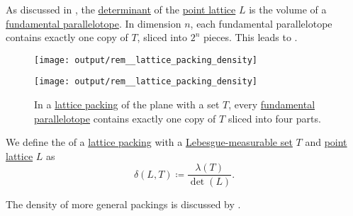 \begin{remark}\label{rem:lattice_packing_density}
  As discussed in , the \hyperref[def:point_lattice_determinant]{determinant} of the \hyperref[def:point_lattice]{point lattice} \( L \) is the volume of a \hyperref[def:fundamental_paralellotope]{fundamental parallelotope}. In dimension \( n \), each fundamental parallelotope contains exactly one copy of \( T \), sliced into \( 2^n \) pieces. This leads to .

  \begin{figure}[!ht]
    \begin{subcaptionblock}{0.45\linewidth}
      \centering
      \texttt{[image: output/rem\_\_lattice\_packing\_density]}
    \end{subcaptionblock}
    \hfill
    \begin{subcaptionblock}{0.45\linewidth}
      \centering
      \texttt{[image: output/rem\_\_lattice\_packing\_density]}
    \end{subcaptionblock}
    \caption{In a \hyperref[def:lattice_packing]{lattice packing} of the plane with a set \( T \), every \hyperref[def:fundamental_paralellotope]{fundamental parallelotope} contains exactly one copy of \( T \) sliced into four parts.}\label{fig:rem:lattice_packing_density}
  \end{figure}
\end{remark}

\begin{definition}\label{def:lattice_packing_density}
  We define the  of a \hyperref[def:lattice_packing]{lattice packing} with a \hyperref[def:lebesgue_measure]{Lebesgue-measurable set} \( T \) and \hyperref[def:point_lattice]{point lattice} \( L \) as
  \begin{equation}\label{eq:def:lattice_packing_density}
    \delta(L, T) \coloneqq \frac {\lambda(T)} {\det(L)}.
  \end{equation}
\end{definition}
\begin{comments}
  \item The density of more general packings is discussed by .
\end{comments}

